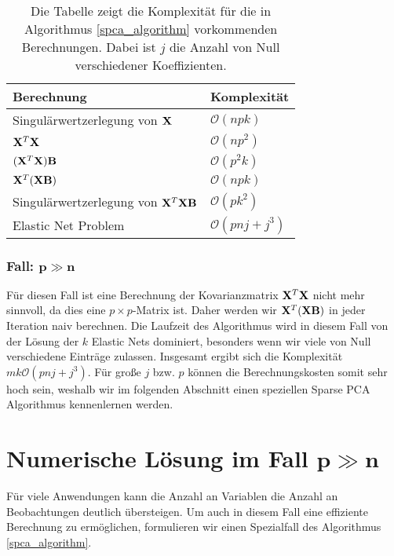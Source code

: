\begin{table}
\centering
\begin{tabular}{ll}
Berechnung & Komplexität\\\hline\addlinespace
Singulärwertzerlegung von $\mathbf{X}$ & $\mathcal{O}(npk)$\\
$\mathbf{X}^T\mathbf{X}$ & $\mathcal{O}(np^2)$\\
$(\mathbf{X}^T\mathbf{X}) \mathbf{B}$ & $\mathcal{O}(p^2k)$\\
$\mathbf{X}^T (\mathbf{X} \mathbf{B})$ & $\mathcal{O}(npk)$\\
Singulärwertzerlegung von $\mathbf{X}^T\mathbf{X} \mathbf{B}$ & $\mathcal{O}(pk^2)$\\
Elastic Net Problem & $\mathcal{O}(pnj + j^3)$
\end{tabular}
\caption{Die Tabelle zeigt die Komplexität für die in Algorithmus \ref{spca_algorithm} vorkommenden Berechnungen. Dabei ist $j$ die Anzahl von Null verschiedener Koeffizienten.}
\label{complexity_calculation}
\end{table}

\subsubsection{Fall: $\mathbf{p \gg n}$}

Für diesen Fall ist eine Berechnung der Kovarianzmatrix $\mathbf{X}^T\mathbf{X}$ nicht mehr sinnvoll, da dies eine $p \times p$-Matrix ist. Daher werden wir $\mathbf{X}^T(\mathbf{X} \mathbf{B})$ in jeder Iteration naiv berechnen. Die Laufzeit des Algorithmus wird in diesem Fall von der Lösung der $k$ Elastic Nets dominiert, besonders wenn wir viele von Null verschiedene Einträge zulassen. Insgesamt ergibt sich die Komplexität $mk\mathcal{O}(pnj + j^3)$. Für große $j$ bzw. $p$ können die Berechnungskosten somit sehr hoch sein, weshalb wir im folgenden Abschnitt einen speziellen Sparse PCA Algorithmus kennenlernen werden.



\section{Numerische Lösung im Fall $\mathbf{p \gg n}$}
\label{numerical_solution_p_greater_n}

Für viele Anwendungen kann die Anzahl an Variablen die Anzahl an Beobachtungen deutlich übersteigen. Um auch in diesem Fall eine effiziente Berechnung zu ermöglichen, formulieren wir einen Spezialfall des Algorithmus \ref{spca_algorithm}.

